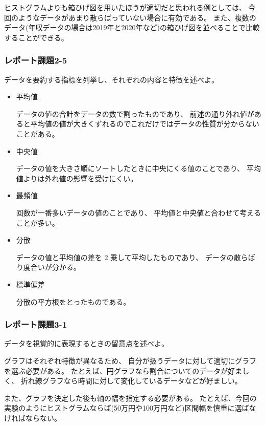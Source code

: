 \documentclass[12pt]{jarticle}
\begin{document}
ヒストグラムよりも箱ひげ図を用いたほうが適切だと思われる例としては、
今回のようなデータがあまり散らばっていない場合に有効である。
また、複数のデータ(年収データの場合は2019年と2020年など)の箱ひげ図を並べることで比較することができる。

\clearpage
\subsubsection*{レポート課題2-5}
\begin{shadebox}
    データを要約する指標を列挙し、それぞれの内容と特徴を述べよ。
\end{shadebox}

\begin{itemize}
    \item 平均値

          データの値の合計をデータの数で割ったものであり、
          前述の通り外れ値があると平均値の値が大きくずれるのでこれだけではデータの性質が分からないことがある。
    \item 中央値

          データの値を大きさ順にソートしたときに中央にくる値のことであり、
          平均値よりは外れ値の影響を受けにくい。
    \item 最頻値

          回数が一番多いデータの値のことであり、
          平均値と中央値と合わせて考えることが多い。
    \item 分散

          データの値と平均値の差を 2 乗して平均したものであり、
          データの散らばり度合いが分かる。
    \item 標準偏差

          分散の平方根をとったものである。
\end{itemize}

\subsubsection*{レポート課題3-1}
\begin{shadebox}
    データを視覚的に表現するときの留意点を述べよ。
\end{shadebox}

グラフはそれぞれ特徴が異なるため、
自分が扱うデータに対して適切にグラフを選ぶ必要がある。
たとえば、円グラフなら割合についてのデータが好ましく、
折れ線グラフなら時間に対して変化しているデータなどが好ましい。

また、グラフを決定した後も軸の幅を指定する必要がある。
たとえば、今回の実験のようにヒストグラムならば(50万円や100万円など)区間幅を慎重に選ばなければならない。
\end{document}
